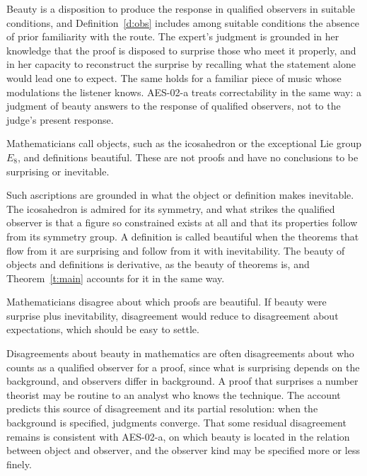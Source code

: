 \documentclass{situationist-preprint}
\begin{document}
\begin{reply}
Beauty is a disposition to produce the response in qualified observers in suitable conditions, and Definition~\ref{d:obs} includes among suitable conditions the absence of prior familiarity with the route. The expert's judgment is grounded in her knowledge that the proof is disposed to surprise those who meet it properly, and in her capacity to reconstruct the surprise by recalling what the statement alone would lead one to expect. The same holds for a familiar piece of music whose modulations the listener knows. AES-02-a treats correctability in the same way: a judgment of beauty answers to the response of qualified observers, not to the judge's present response.
\end{reply}

\begin{objection}
Mathematicians call objects, such as the icosahedron or the exceptional Lie group $E_8$, and definitions beautiful. These are not proofs and have no conclusions to be surprising or inevitable.
\end{objection}

\begin{reply}
Such ascriptions are grounded in what the object or definition makes inevitable. The icosahedron is admired for its symmetry, and what strikes the qualified observer is that a figure so constrained exists at all and that its properties follow from its symmetry group. A definition is called beautiful when the theorems that flow from it are surprising and follow from it with inevitability. The beauty of objects and definitions is derivative, as the beauty of theorems is, and Theorem~\ref{t:main} accounts for it in the same way.
\end{reply}

\begin{objection}[Disagreement]
Mathematicians disagree about which proofs are beautiful. If beauty were surprise plus inevitability, disagreement would reduce to disagreement about expectations, which should be easy to settle.
\end{objection}

\begin{reply}
Disagreements about beauty in mathematics are often disagreements about who counts as a qualified observer for a proof, since what is surprising depends on the background, and observers differ in background. A proof that surprises a number theorist may be routine to an analyst who knows the technique. The account predicts this source of disagreement and its partial resolution: when the background is specified, judgments converge. That some residual disagreement remains is consistent with AES-02-a, on which beauty is located in the relation between object and observer, and the observer kind may be specified more or less finely.
\end{reply}
\end{document}
